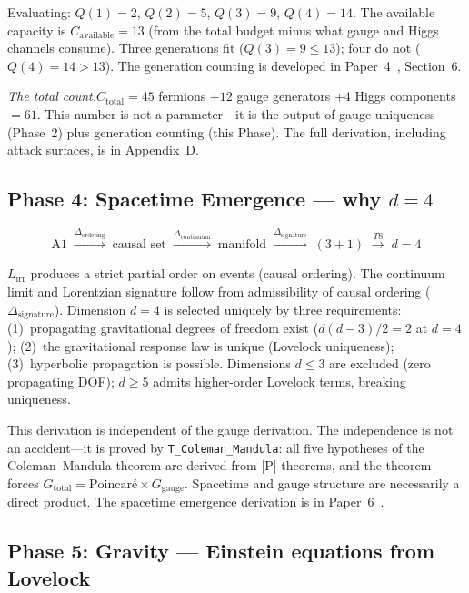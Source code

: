 \documentclass[11pt]{article}
\begin{document}
Evaluating: $Q(1)=2$, $Q(2)=5$, $Q(3)=9$, $Q(4)=14$.  The available capacity is $C_{\mathrm{available}} = 13$ (from the total budget minus what gauge and Higgs channels consume).  Three generations fit ($Q(3) = 9 \le 13$); four do not ($Q(4) = 14 > 13$).  The generation counting is developed in Paper~4~\cite{P4}, Section~6.

\textit{The total count.}\quad $C_{\mathrm{total}} = 45$ fermions $+ 12$ gauge generators $+ 4$ Higgs components $= 61$.  This number is not a parameter---it is the output of gauge uniqueness (Phase~2) plus generation counting (this Phase).  The full derivation, including attack surfaces, is in Appendix~D.


\subsection{Phase 4: Spacetime Emergence --- why \texorpdfstring{$d=4$}{d=4}}

\begin{equation}
\text{A1} \;\xrightarrow{\Delta_{\mathrm{ordering}}}\; \text{causal set} \;\xrightarrow{\Delta_{\mathrm{continuum}}}\; \text{manifold} \;\xrightarrow{\Delta_{\mathrm{signature}}}\; (3{+}1) \;\xrightarrow{T8}\; d=4
\end{equation}

$L_{\mathrm{irr}}$ produces a strict partial order on events (causal ordering).  The continuum limit and Lorentzian signature follow from admissibility of causal ordering ($\Delta_{\mathrm{signature}}$).  Dimension $d=4$ is selected uniquely by three requirements: (1)~propagating gravitational degrees of freedom exist ($d(d-3)/2 = 2$ at $d=4$); (2)~the gravitational response law is unique (Lovelock uniqueness); (3)~hyperbolic propagation is possible.  Dimensions $d \le 3$ are excluded (zero propagating DOF); $d \ge 5$ admits higher-order Lovelock terms, breaking uniqueness.

This derivation is independent of the gauge derivation.  The independence is not an accident---it is proved by \texttt{T\_Coleman\_Mandula}: all five hypotheses of the Coleman--Mandula theorem are derived from [P] theorems, and the theorem forces $G_{\mathrm{total}} = \text{Poincar\'e} \times G_{\mathrm{gauge}}$.  Spacetime and gauge structure are necessarily a direct product.  The spacetime emergence derivation is in Paper~6~\cite{P6}.


\subsection{Phase 5: Gravity --- Einstein equations from Lovelock}
\end{document}
